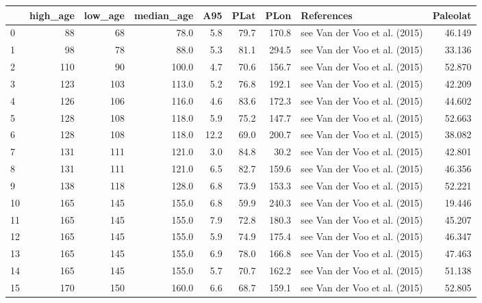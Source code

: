\documentclass[11pt]{article}
\begin{document}
    {\tiny\begin{tabular}{lrrrrrrlr}
\toprule
{} &  high\_age &  low\_age &  median\_age &   A95 &  PLat &   PLon &                        References &  Paleolat \\
\midrule
0  &        88 &       68 &        78.0 &   5.8 &  79.7 &  170.8 &     see Van der Voo et al. (2015) &    46.149 \\
1  &        98 &       78 &        88.0 &   5.3 &  81.1 &  294.5 &     see Van der Voo et al. (2015) &    33.136 \\
2  &       110 &       90 &       100.0 &   4.7 &  70.6 &  156.7 &     see Van der Voo et al. (2015) &    52.870 \\
3  &       123 &      103 &       113.0 &   5.2 &  76.8 &  192.1 &     see Van der Voo et al. (2015) &    42.209 \\
4  &       126 &      106 &       116.0 &   4.6 &  83.6 &  172.3 &     see Van der Voo et al. (2015) &    44.602 \\
5  &       128 &      108 &       118.0 &   5.9 &  75.2 &  147.7 &     see Van der Voo et al. (2015) &    52.663 \\
6  &       128 &      108 &       118.0 &  12.2 &  69.0 &  200.7 &     see Van der Voo et al. (2015) &    38.082 \\
7  &       131 &      111 &       121.0 &   3.0 &  84.8 &   30.2 &     see Van der Voo et al. (2015) &    42.801 \\
8  &       131 &      111 &       121.0 &   6.5 &  82.7 &  159.6 &     see Van der Voo et al. (2015) &    46.356 \\
9  &       138 &      118 &       128.0 &   6.8 &  73.9 &  153.3 &     see Van der Voo et al. (2015) &    52.221 \\
10 &       165 &      145 &       155.0 &   6.8 &  59.9 &  240.3 &     see Van der Voo et al. (2015) &    19.446 \\
11 &       165 &      145 &       155.0 &   7.9 &  72.8 &  180.3 &     see Van der Voo et al. (2015) &    45.207 \\
12 &       165 &      145 &       155.0 &   5.9 &  74.9 &  175.4 &     see Van der Voo et al. (2015) &    46.347 \\
13 &       165 &      145 &       155.0 &   6.9 &  78.0 &  166.8 &     see Van der Voo et al. (2015) &    47.463 \\
14 &       165 &      145 &       155.0 &   5.7 &  70.7 &  162.2 &     see Van der Voo et al. (2015) &    51.138 \\
15 &       170 &      150 &       160.0 &   6.6 &  68.7 &  159.1 &     see Van der Voo et al. (2015) &    52.805 \\

\end{tabular}}
\end{document}
